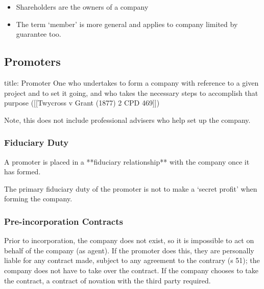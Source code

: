 \documentclass[
]{article}
\newenvironment{Shaded}{}{}
\newcommand{\NormalTok}[1]{#1}
\providecommand{\tightlist}{%
  \setlength{\itemsep}{0pt}\setlength{\parskip}{0pt}}
\begin{document}
\begin{itemize}
\tightlist
\item
  Shareholders are the owners of a company
\item
  The term `member' is more general and applies to company limited by
  guarantee too.
\end{itemize}

\hypertarget{promoters}{%
\subsection{Promoters}\label{promoters}}

\begin{Shaded}
\begin{Highlighting}[]
\NormalTok{title: Promoter}
\NormalTok{One who undertakes to form a company with reference to a given project and to set it going, and who takes the necessary steps to accomplish that purpose ([[Twycross v Grant (1877) 2 CPD 469]])}
\end{Highlighting}
\end{Shaded}

Note, this does not include professional advisers who help set up the
company.

\hypertarget{fiduciary-duty}{%
\subsubsection{Fiduciary Duty}\label{fiduciary-duty}}

\begin{Shaded}
\begin{Highlighting}[]
\NormalTok{A promoter is placed in a **fiduciary relationship** with the company once it has formed. }
\end{Highlighting}
\end{Shaded}

The primary fiduciary duty of the promoter is not to make a `secret
profit' when forming the company.

\hypertarget{pre-incorporation-contracts}{%
\subsubsection{Pre-incorporation
Contracts}\label{pre-incorporation-contracts}}

Prior to incorporation, the company does not exist, so it is impossible
to act on behalf of the company (as agent). If the promoter does this,
they are personally liable for any contract made, subject to any
agreement to the contrary (s 51); the company does not have to take over
the contract. If the company chooses to take the contract, a contract of
novation with the third party required.
\end{document}
